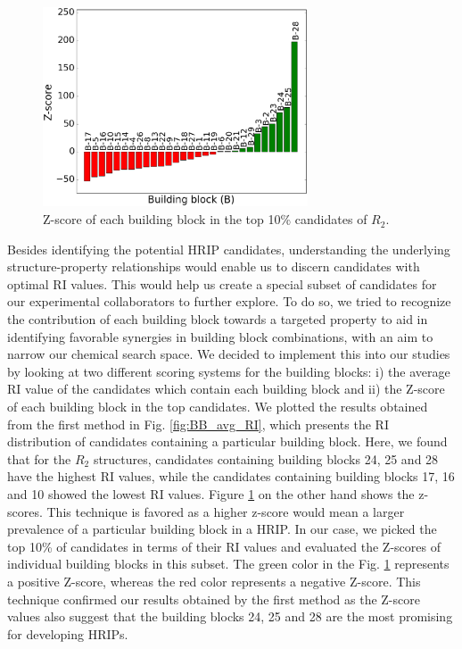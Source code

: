 \begin{figure}[htbp] 
	\centering
	\includegraphics[width=0.700\textwidth]{Chapter-5/Figures/BB_top_Z.eps}
	\caption{Z-score of each building block in the top 10\% candidates of $R_2$.} 
	\label{fig:BB_top_Z} 
\end{figure}  

Besides identifying the potential HRIP candidates, understanding the underlying structure-property relationships would enable us to discern candidates with optimal RI values. This would help us create a special subset of candidates for our experimental collaborators to further explore. To do so, we tried to recognize the contribution of each building block towards a targeted property to aid in identifying favorable synergies in building block combinations, with an aim to narrow our chemical search space. We decided to implement this into our studies by looking at two different scoring systems for the building blocks: i) the average RI value of the candidates which contain each building block and ii) the Z-score of each building block in the top candidates. We plotted the results obtained from the first method in Fig. \ref{fig:BB_avg_RI}, which presents the RI distribution of candidates containing a particular building block. Here, we found that for the $R_2$ structures, candidates containing building blocks 24, 25 and 28 have the highest RI values, while the candidates containing building blocks 17, 16 and 10 showed the lowest RI values. Figure \ref{fig:BB_top_Z} on the other hand shows the z-scores. This technique is favored as a higher z-score would mean a larger prevalence of a particular building block in a HRIP. In our case, we picked the top 10\% of candidates in terms of their RI values and evaluated the Z-scores of individual building blocks in this subset. The green color in the Fig. \ref{fig:BB_top_Z} represents a positive Z-score, whereas the red color represents a negative Z-score. This technique confirmed our results obtained by the first method as the Z-score values also suggest that the building blocks 24, 25 and 28 are the most promising for developing HRIPs.  

